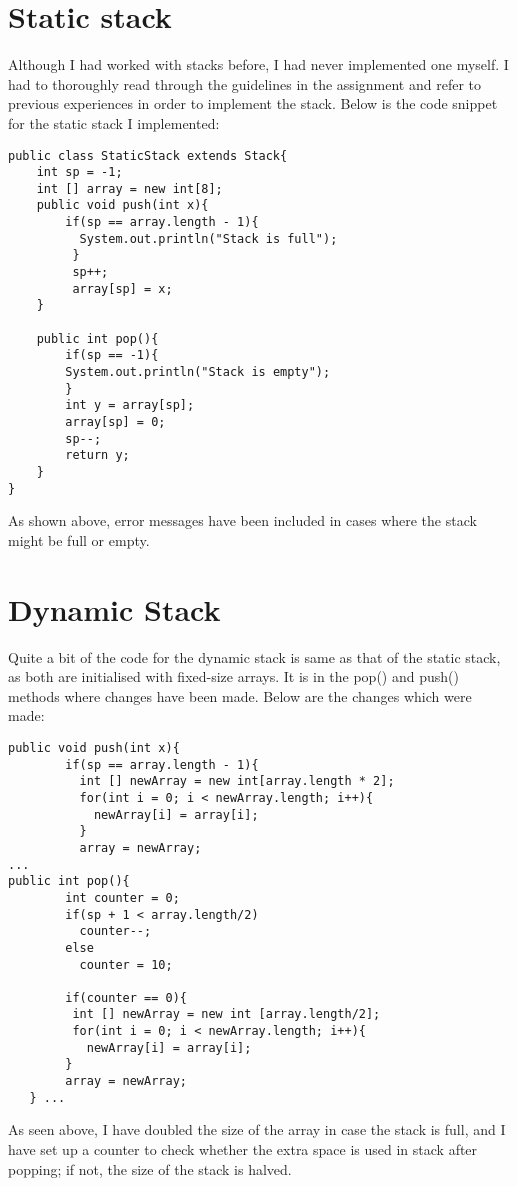 \documentclass[a4paper,11pt]{article}
\begin{document}
\section*{Static stack}
Although I had worked with stacks before, I had never implemented one myself. I had to thoroughly read through the guidelines in the assignment and refer to previous experiences in order to implement the stack. Below is the code snippet for the static stack I implemented:

\begin{verbatim}
public class StaticStack extends Stack{
    int sp = -1;
    int [] array = new int[8];
    public void push(int x){
        if(sp == array.length - 1){
          System.out.println("Stack is full");
         } 
         sp++;
         array[sp] = x; 
    }
    
    public int pop(){
        if(sp == -1){
        System.out.println("Stack is empty");
        }
        int y = array[sp];
        array[sp] = 0;
        sp--;
        return y;
    }
}
\end{verbatim}
As shown above, error messages have been included in cases where the stack might be full or empty.  

\section*{Dynamic Stack}
Quite a bit of the code for the dynamic stack is same as that of the static stack, as both are initialised with fixed-size arrays. It is in the pop() and push() methods where changes have been made. Below are the changes which were made:

\begin{verbatim}
public void push(int x){
        if(sp == array.length - 1){
          int [] newArray = new int[array.length * 2];
          for(int i = 0; i < newArray.length; i++){
            newArray[i] = array[i];
          }
          array = newArray;
...
public int pop(){
        int counter = 0;
        if(sp + 1 < array.length/2)
          counter--;
        else
          counter = 10;
        
        if(counter == 0){
         int [] newArray = new int [array.length/2];
         for(int i = 0; i < newArray.length; i++){
           newArray[i] = array[i];
        }
        array = newArray;
   } ...
\end{verbatim}
As seen above, I have doubled the size of the array in case the stack is full, and I have set up a counter to check whether the extra space is used in stack after popping; if not, the size of the stack is halved.
\end{document}
